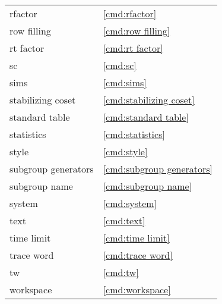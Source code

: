 {\begin{minipage}[b]{6cm}
\begin{tabular}{ll}
rfactor&\ref{cmd:rfactor}\\
row filling&\ref{cmd:row filling}\\
rt factor&\ref{cmd:rt factor}\\
sc&\ref{cmd:sc}\\
sims&\ref{cmd:sims}\\
stabilizing coset&\ref{cmd:stabilizing coset}\\
standard table&\ref{cmd:standard table}\\
statistics&\ref{cmd:statistics}\\
style&\ref{cmd:style}\\
subgroup generators&\ref{cmd:subgroup generators}\\
subgroup name&\ref{cmd:subgroup name}\\
system&\ref{cmd:system}\\
text&\ref{cmd:text}\\
time limit&\ref{cmd:time limit}\\
trace word&\ref{cmd:trace word}\\
tw&\ref{cmd:tw}\\
workspace&\ref{cmd:workspace}\\
\end{tabular}
\end{minipage}
}
